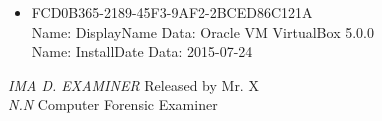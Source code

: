 \begin{enumerate}
\begin{itemize}
\begin{itemize}
		\item \textbraceleft FCD0B365-2189-45F3-9AF2-2BCED86C121A \textbraceright \\
		Name: DisplayName Data: Oracle VM VirtualBox 5.0.0 \\
		Name: InstallDate Data: 2015-07-24 \\
		
		
	\end{itemize}
	
	
\end{itemize}

\end{enumerate}

\noindent \textit{IMA D. EXAMINER}	\hfill Released by {\wesa Mr. X}\\
\textit{N.N} Computer Forensic Examiner
\clearpage
